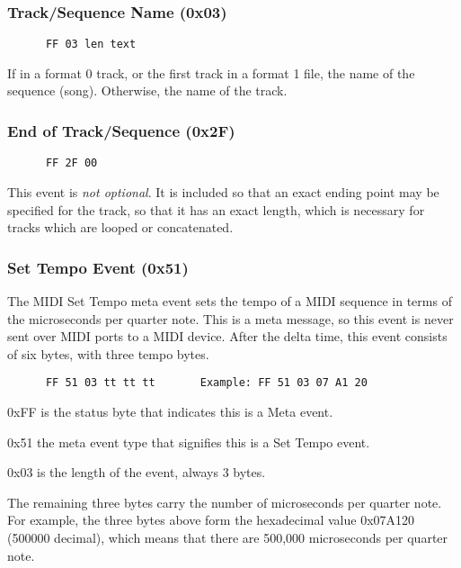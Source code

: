 \subsubsection{Track/Sequence Name (0x03)}
\label{subsubsec:midi_meta_sequence_name}

   \begin{verbatim}
      FF 03 len text
   \end{verbatim}

   If in a format 0 track, or the first track in a format 1 file, the name
   of the sequence (song).  Otherwise, the name of the track.

\subsubsection{End of Track/Sequence (0x2F)}
\label{subsubsec:midi_meta_end_of_track}

   \begin{verbatim}
      FF 2F 00
   \end{verbatim}

   This event is \textsl{not optional}.
   It is included so that an exact ending
   point may be specified for the track, so that it has an exact length,
   which is necessary for tracks which are looped or concatenated.

\subsubsection{Set Tempo Event (0x51)}
\label{subsubsec:midi_meta_set_tempo}

   The MIDI Set Tempo meta event sets the tempo of a MIDI sequence in terms of
   the microseconds per quarter note.  This is a meta message, so this event is
   never sent over MIDI ports to a MIDI device.
   After the delta time, this event consists of six bytes, with three
   tempo bytes.

   \begin{verbatim}
      FF 51 03 tt tt tt       Example: FF 51 03 07 A1 20
   \end{verbatim}

   \begin{enumber}
      \item 0xFF is the status byte that indicates this is a Meta event.
      \item 0x51 the meta event type that signifies this is a Set Tempo event.
      \item 0x03 is the length of the event, always 3 bytes.
      \item The remaining three bytes carry the number of microseconds per
         quarter note.  For example, the three bytes above form the hexadecimal
         value 0x07A120 (500000 decimal), which means that there are 500,000
         microseconds per quarter note.
   \end{enumber}

